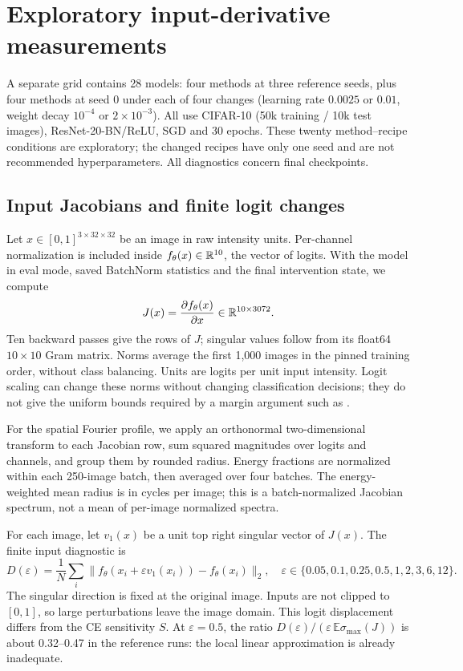 \FloatBarrier
\section{Exploratory input-derivative measurements}
\label{app:input}
A separate grid contains 28 models: four methods at three reference seeds, plus four methods at seed 0 under each of four changes (learning rate $0.0025$ or $0.01$, weight decay $10^{-4}$ or $2\times10^{-3}$). All use CIFAR-10 (50k training / 10k test images), ResNet-20-BN/ReLU, SGD and 30 epochs. These twenty method--recipe conditions are exploratory; the changed recipes have only one seed and are not recommended hyperparameters. All diagnostics concern final checkpoints.

\subsection{Input Jacobians and finite logit changes}
Let $x\in[0,1]^{3\times32\times32}$ be an image in raw intensity units. Per-channel normalization is included inside $f_\theta(x)\in\mathbb R^{10}$, the vector of logits. With the model in eval mode, saved BatchNorm statistics and the final intervention state, we compute
\[
 J(x)=\frac{\partial f_\theta(x)}{\partial x}\in\mathbb R^{10\times3072}.
\]
Ten backward passes give the rows of $J$; singular values follow from its float64 $10\times10$ Gram matrix. Norms average the first 1,000 images in the pinned training order, without class balancing. Units are logits per unit input intensity. Logit scaling can change these norms without changing classification decisions; they do not give the uniform bounds required by a margin argument such as \citet{sokolic2017robust}.


For the spatial Fourier profile, we apply an orthonormal two-dimensional transform to each Jacobian row, sum squared magnitudes over logits and channels, and group them by rounded radius. Energy fractions are normalized within each 250-image batch, then averaged over four batches. The energy-weighted mean radius is in cycles per image; this is a batch-normalized Jacobian spectrum, not a mean of per-image normalized spectra.

For each image, let $v_1(x)$ be a unit top right singular vector of $J(x)$. The finite input diagnostic is
\[
 D(\varepsilon)=\frac1N\sum_i
 \|f_\theta(x_i+\varepsilon v_1(x_i))-f_\theta(x_i)\|_2,
 \quad \varepsilon\in\{0.05,0.1,0.25,0.5,1,2,3,6,12\}.
\]
The singular direction is fixed at the original image. Inputs are not clipped to $[0,1]$, so large perturbations leave the image domain. This logit displacement differs from the CE sensitivity $S$. At $\varepsilon=0.5$, the ratio $D(\varepsilon)/(\varepsilon\,\mathbb E\sigma_{\max}(J))$ is about 0.32--0.47 in the reference runs: the local linear approximation is already inadequate.

